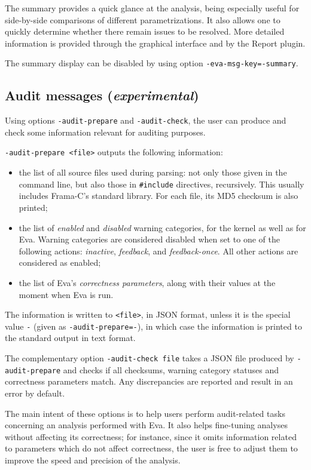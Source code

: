 \documentclass[web]{frama-c-book}
\newcommand{\Eva}{\textsf{Eva}}
\begin{document}
The summary provides a quick glance at the analysis, being especially useful
for side-by-side comparisons of different parametrizations. It also allows
one to quickly determine whether there remain issues to be resolved.
More detailed information is provided through the graphical interface and
by the Report plugin.

The summary display can be disabled by using option
\lstinline|-eva-msg-key=-summary|.

\subsection{Audit messages ({\em experimental})}

Using options \lstinline|-audit-prepare| and \lstinline|-audit-check|, the
user can produce and check some information relevant for auditing purposes.

\lstinline|-audit-prepare <file>| outputs the following information:

\begin{itemize}
\item the list of all source files used during parsing: not only those
  given in the command line, but also those in \lstinline|#include|
  directives, recursively. This usually includes Frama-C's standard library.
  For each file, its MD5 checksum is also printed;
\item the list of {\em enabled} and {\em disabled} warning categories,
  for the kernel as well as for \Eva{}. Warning categories are considered
  disabled when set to one of the following actions: {\em inactive},
  {\em feedback}, and {\em feedback-once}. All other actions are considered
  as enabled;
\item the list of Eva's {\em correctness parameters}, along with their values
  at the moment when Eva is run.
\end{itemize}

The information is written to \lstinline|<file>|, in JSON format, unless it
is the special value \lstinline|-| (given as \lstinline|-audit-prepare=-|),
in which case the information is printed to the standard output in text format.

The complementary option \lstinline|-audit-check file| takes a JSON file
produced by \lstinline|-audit-prepare| and checks if all checksums, warning
category statuses and correctness parameters match. Any discrepancies are
reported and result in an error by default.

The main intent of these options is to help users perform audit-related
tasks concerning an analysis performed with Eva. It also helps fine-tuning
analyses without affecting its correctness; for instance, since it omits
information related to parameters which do not affect correctness, the user
is free to adjust them to improve the speed and precision of the analysis.
\end{document}

